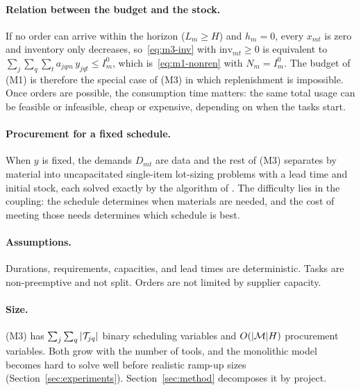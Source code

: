 \paragraph{Relation between the budget and the stock.}
If no order can arrive within the horizon ($L_m \ge H$) and $h_m = 0$, every
$x_{mt}$ is zero and inventory only decreases, so~\eqref{eq:m3-inv} with
$\mathrm{inv}_{mt} \ge 0$ is equivalent to
$\sum_{j}\sum_{q}\sum_{t} a_{jqm}\, y_{jqt} \le I^0_m$, which
is~\eqref{eq:m1-nonren} with $N_m = I^0_m$. The budget of (M1) is therefore
the special case of (M3) in which replenishment is impossible. Once orders are
possible, the consumption time matters: the same total usage can be feasible
or infeasible, cheap or expensive, depending on when the tasks start.

\paragraph{Procurement for a fixed schedule.}
When $y$ is fixed, the demands $D_{mt}$ are data and the rest of (M3)
separates by material into uncapacitated single-item lot-sizing problems with
a lead time and initial stock, each solved exactly by the algorithm of
\citet{wagner1958dynamic}. The difficulty lies in the coupling: the schedule
determines when materials are needed, and the cost of meeting those needs
determines which schedule is best.

\paragraph{Assumptions.}
Durations, requirements, capacities, and lead times are deterministic. Tasks
are non-preemptive and not split. Orders are not limited by supplier capacity.

\paragraph{Size.}
(M3) has $\sum_{j}\sum_{q} |\mathcal{T}_{jq}|$ binary scheduling variables and
$O(|\mathcal{M}| H)$ procurement variables. Both grow with the number of tools, and
the monolithic model becomes hard to solve well before realistic ramp-up
sizes (Section~\ref{sec:experiments}). Section~\ref{sec:method} decomposes it
by project.
